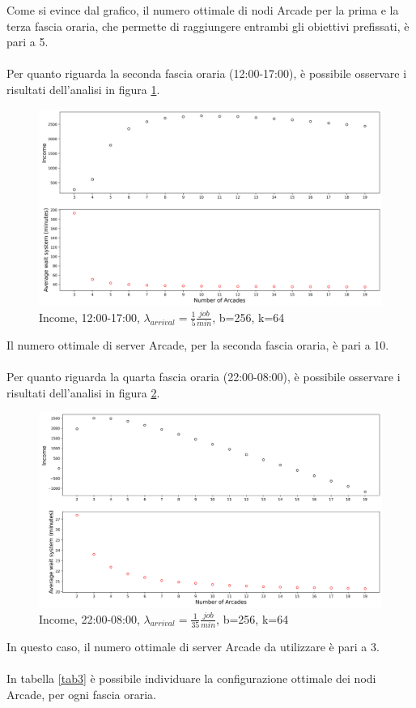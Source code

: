 \documentclass{article}
\begin{document}
Come si evince dal grafico, il numero ottimale di nodi Arcade per la prima e la terza fascia oraria, che permette di raggiungere entrambi gli obiettivi prefissati, è pari a 5.
\\ \\
Per quanto riguarda la seconda fascia oraria (12:00-17:00), è possibile osservare i risultati dell'analisi in figura \ref{figura:avg_wait_sys_aft}.
\begin{figure}[H]
	\centering
	\captionsetup{justification=centering,margin=2cm}
	\includegraphics[scale=0.48]{images/avg_wait_sys_aft.png}
	\caption{Income, 12:00-17:00, $\lambda_{arrival}=\frac{1}{5} \frac{job}{min}$, b=256, k=64}\label{figura:avg_wait_sys_aft}
\end{figure}
Il numero ottimale di server Arcade, per la seconda fascia oraria, è pari a 10.
\\ \\
Per quanto riguarda la quarta fascia oraria (22:00-08:00), è possibile osservare i risultati dell'analisi in figura \ref{figura:avg_wait_sys_night}.
\begin{figure}[H]
	\centering
	\captionsetup{justification=centering,margin=2cm}
	\includegraphics[scale=0.48]{images/avg_wait_sys_night.png}
	\caption{Income, 22:00-08:00, $\lambda_{arrival}=\frac{1}{35} \frac{job}{min}$, b=256, k=64}\label{figura:avg_wait_sys_night}
\end{figure}
In questo caso, il numero ottimale di server Arcade da utilizzare è pari a 3.
\\ \\
In tabella \ref{tab3} è possibile individuare la configurazione ottimale dei nodi Arcade, per ogni fascia oraria.
\end{document}
